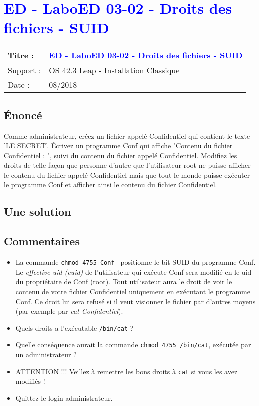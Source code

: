 \lstset{language=c}
\renewcommand{\titre}{\textcolor{blue}{ ED - LaboED 03-02 - Droits des fichiers  - SUID}}

\lhead{ \titre }
\section{{\titre} }

\begin{tabular}{|l|l|}
\hline
Titre : 	& \titre \\\hline
Support : 	& OS 42.3 Leap - Installation Classique \\\hline
Date :		& 08/2018 \\\hline
\end{tabular}

\subsection{Énoncé}

Comme administrateur, créez un fichier appelé Confidentiel qui contient le texte 'LE SECRET'. 
Écrivez un programme Conf qui affiche "Contenu du fichier Confidentiel : ", suivi du contenu du fichier appelé Confidentiel. 
Modifiez les droits de telle façon que personne d'autre que l'utilisateur root ne puisse afficher le contenu du fichier appelé Confidentiel mais que tout le monde puisse exécuter le programme Conf et afficher ainsi le contenu du fichier Confidentiel.

\subsection{Une solution}



\subsection{Commentaires}

\begin{itemize}
\item La commande \verb+chmod 4755 Conf + positionne le bit SUID du programme Conf.  Le \emph{effective uid (euid)} de l'utilisateur qui exécute Conf sera modifié en le uid du propriétaire de Conf (root). Tout utilisateur aura le droit de voir le contenu de votre fichier  Confidentiel uniquement en exécutant le programme Conf. Ce droit lui sera refusé si il veut visionner le fichier par d'autres moyens (par exemple par \emph{cat Confidentiel}).
\item Quels droits a l'exécutable \verb+/bin/cat+ ?
\item Quelle conséquence aurait la commande \verb+chmod 4755 /bin/cat+, exécutée par un administrateur ?
\item ATTENTION !!! Veillez à remettre les bons droits à \verb+cat+ si vous les avez modifiés !
\item Quittez le login administrateur.
\end{itemize}
\newpage
